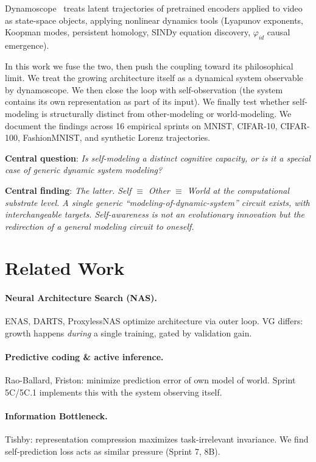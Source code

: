 \documentclass[11pt]{article}
\begin{document}
Dynamoscope~\cite{aglas2026dynamoscope} treats latent trajectories of pretrained encoders applied to video as state-space objects, applying nonlinear dynamics tools (Lyapunov exponents, Koopman modes, persistent homology, SINDy equation discovery, $\varphi_{id}$ causal emergence).

In this work we fuse the two, then push the coupling toward its philosophical limit. We treat the growing architecture itself as a dynamical system observable by dynamoscope. We then close the loop with self-observation (the system contains its own representation as part of its input). We finally test whether self-modeling is structurally distinct from other-modeling or world-modeling. We document the findings across 16 empirical sprints on MNIST, CIFAR-10, CIFAR-100, FashionMNIST, and synthetic Lorenz trajectories.

\textbf{Central question}: \emph{Is self-modeling a distinct cognitive capacity, or is it a special case of generic dynamic system modeling?}

\textbf{Central finding}: \emph{The latter. Self $\equiv$ Other $\equiv$ World at the computational substrate level. A single generic ``modeling-of-dynamic-system'' circuit exists, with interchangeable targets. Self-awareness is not an evolutionary innovation but the redirection of a general modeling circuit to oneself.}

\section{Related Work}

\paragraph{Neural Architecture Search (NAS).} ENAS, DARTS, ProxylessNAS optimize architecture via outer loop. VG differs: growth happens \emph{during} a single training, gated by validation gain.

\paragraph{Predictive coding \& active inference.} Rao-Ballard, Friston: minimize prediction error of own model of world. Sprint 5C/5C.1 implements this with the system observing itself.

\paragraph{Information Bottleneck.} Tishby: representation compression maximizes task-irrelevant invariance. We find self-prediction loss acts as similar pressure (Sprint 7, 8B).
\end{document}
